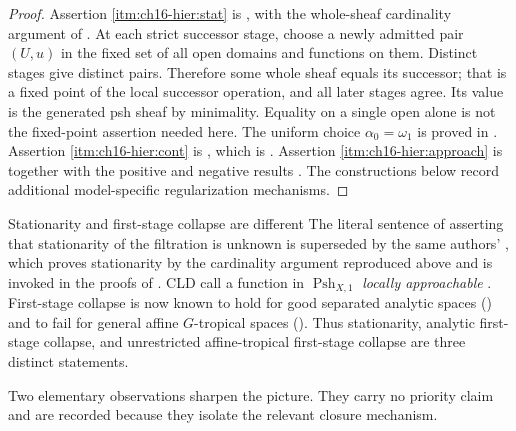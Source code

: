\begin{proof}
Assertion \cref{itm:ch16-hier:stat} is
\cite[Lemma~8.1.4]{CLD25}, with the whole-sheaf cardinality argument
of .  At each strict successor stage,
choose a newly admitted pair $(U,u)$ in the fixed set of all open domains
and functions on them.  Distinct stages give distinct pairs.  Therefore
some whole sheaf equals its successor; that is a fixed point of the local
successor operation, and all later stages agree.  Its value is the generated
psh sheaf by minimality.  Equality on a single open alone is not the
fixed-point assertion needed here.  The uniform choice
$\alpha_0=\omega_1$ is proved in
.  Assertion
\cref{itm:ch16-hier:cont} is , which is
\cite[Proposition~8.1.11]{CLD25}.  Assertion
\cref{itm:ch16-hier:approach} is \cite[Definition~8.1.13]{CLD25} together
with the positive and negative results
.  The constructions below record
additional model-specific regularization mechanisms.
\end{proof}

\begin{warning}{Stationarity and first-stage collapse are different}
The literal sentence of \cite[Remark~8.1.6]{CLD25} asserting that
stationarity of the filtration is unknown is superseded by the same
authors' \cite[Lemma~8.1.4]{CLD25}, which proves stationarity by the
cardinality argument reproduced above and is invoked in the proofs of
\cite[Propositions~8.1.5, 8.1.11 and 8.2.1]{CLD25}.  CLD call a function in
$\operatorname{Psh}_{X,1}$ \emph{locally approachable}
\cite[Definition~8.1.13]{CLD25}.  First-stage collapse is now known to hold
for good separated analytic spaces
() and to fail for general
affine $G$-tropical spaces
().  Thus stationarity, analytic
first-stage collapse, and unrestricted affine-tropical first-stage collapse
are three distinct statements.
\end{warning}

Two elementary observations sharpen the picture.  They carry no priority
claim and are recorded because they isolate the relevant closure mechanism.

